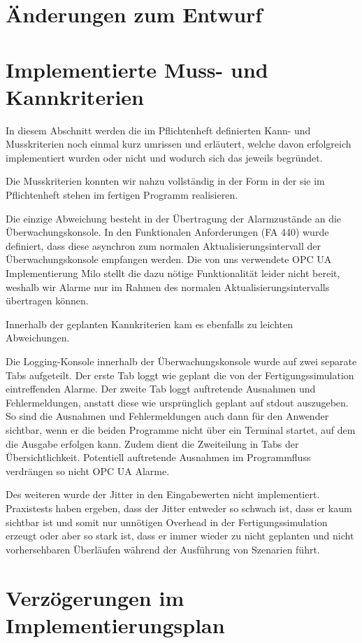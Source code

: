 \documentclass[parskip=full]{scrartcl}
\begin{document}
\section{Änderungen zum Entwurf}


\section{Implementierte Muss- und Kannkriterien}
In diesem Abschnitt werden die im Pflichtenheft definierten Kann- und Musskriterien noch einmal kurz umrissen und erläutert, welche davon erfolgreich
implementiert wurden oder nicht und wodurch sich das jeweils begründet.

Die Musskriterien konnten wir nahzu vollständig in der Form in der sie im Pflichtenheft stehen im fertigen Programm realisieren.

Die einzige Abweichung besteht in der Übertragung der Alarmzustände an die Überwachungskonsole. In den Funktionalen Anforderungen (FA 440) wurde definiert,
dass diese asynchron zum normalen Aktualisierungsintervall der Überwachungskonsole empfangen werden. Die von uns verwendete OPC UA Implementierung Milo
stellt die dazu nötige Funktionalität leider nicht bereit, weshalb wir Alarme nur im Rahmen des normalen Aktualisierungsintervalls übertragen können.

Innerhalb der geplanten Kannkriterien kam es ebenfalls zu leichten Abweichungen.

Die Logging-Konsole innerhalb der Überwachungskonsole wurde auf zwei separate Tabs aufgeteilt. Der erste Tab loggt wie geplant die von der Fertigungssimulation
eintreffenden Alarme. Der zweite Tab loggt auftretende Ausnahmen und Fehlermeldungen, anstatt diese wie ursprünglich geplant auf stdout auszugeben. So sind die
Ausnahmen und Fehlermeldungen auch dann für den Anwender sichtbar, wenn er die beiden Programme nicht über ein Terminal startet, auf dem die Ausgabe erfolgen kann.
Zudem dient die Zweiteilung in Tabs der Übersichtlichkeit. Potentiell auftretende Ausnahmen im Programmfluss verdrängen so nicht OPC UA Alarme.

Des weiteren wurde der Jitter in den Eingabewerten nicht implementiert. Praxistests haben ergeben, dass der Jitter entweder so schwach ist, dass er kaum sichtbar
ist und somit nur unnötigen Overhead in der Fertigungssimulation erzeugt oder aber so stark ist, dass er immer wieder zu nicht geplanten und nicht vorhersehbaren
Überläufen während der Ausführung von Szenarien führt.

\section{Verzögerungen im Implementierungsplan}
\end{document}
